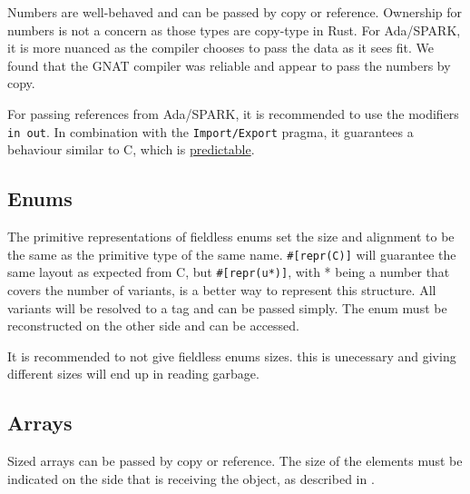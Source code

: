 \documentclass[nomenclature, english, bibtex]{kththesis}
\begin{document}
Numbers are well-behaved and can be passed by copy or reference. Ownership for numbers is not a concern as those types are \gls{copy-type} in Rust. For Ada/SPARK, it is more nuanced as the compiler chooses to pass the data as it sees fit. We found that the GNAT compiler was reliable and appear to pass the numbers by copy.


For passing references from Ada/SPARK, it is recommended to use the modifiers \texttt{in out}. In combination with the \texttt{Import/Export} pragma, it guarantees a behaviour similar to C, which is \href{https://en.wikibooks.org/wiki/Ada_Programming/Types/access}{predictable}.


\subsection{Enums}

The primitive representations of fieldless enums set the size and alignment to be the same as the primitive type of the same name. \texttt{\#[repr(C)]} will guarantee the same layout as expected from C, but \texttt{\#[repr(u*)]}, with * being a number that covers the number of variants, is a better way to represent this structure. All variants will be resolved to a tag and can be passed simply. The enum must be reconstructed on the other side and can be accessed.

It is recommended to not give fieldless enums sizes. this is unecessary and giving different sizes will end up in reading garbage.

\subsection{Arrays}

Sized arrays can be passed by copy or reference. The size of the elements must be indicated on the side that is receiving the object, as described in .
\end{document}
